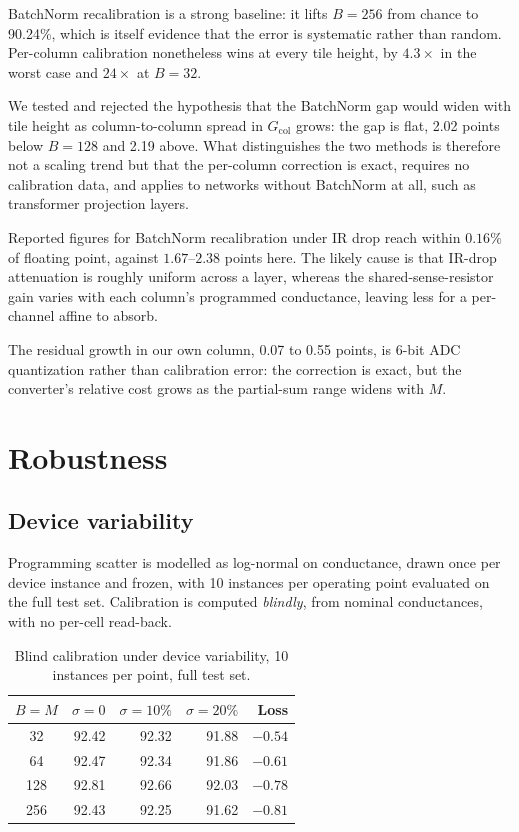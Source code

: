 \documentclass[conference,10pt]{IEEEtran}
\newcommand{\Gcol}{G_{\mathrm{col}}}
\begin{document}
BatchNorm recalibration is a strong baseline: it lifts $B{=}256$ from chance to
90.24\%, which is itself evidence that the error is systematic rather than
random. Per-column calibration nonetheless wins at every tile height, by
$4.3\times$ in the worst case and $24\times$ at $B{=}32$.

We tested and rejected the hypothesis that the BatchNorm gap would widen with
tile height as column-to-column spread in $\Gcol$ grows: the gap is flat, 2.02
points below $B{=}128$ and 2.19 above. What distinguishes the two methods is
therefore not a scaling trend but that the per-column correction is exact,
requires no calibration data, and applies to networks without BatchNorm at
all, such as transformer projection layers.

Reported figures for BatchNorm recalibration under IR drop reach within
$0.16\%$ of floating point, against $1.67$--$2.38$ points here. The likely cause is that IR-drop attenuation is
roughly uniform across a layer, whereas the shared-sense-resistor gain varies
with each column's programmed conductance, leaving less for a per-channel
affine to absorb.

The residual growth in our own column, 0.07 to 0.55 points, is 6-bit ADC
quantization rather than calibration error: the correction is exact, but the
converter's relative cost grows as the partial-sum range widens with $M$.

\section{Robustness}
\label{sec:robust}

\subsection{Device variability}

Programming scatter is modelled as log-normal on conductance, drawn once per
device instance and frozen, with 10 instances per operating point evaluated on
the full test set. Calibration is computed \emph{blindly}, from nominal
conductances, with no per-cell read-back.

\begin{table}[t]
\centering
\caption{Blind calibration under device variability, 10 instances per point,
full test set.}
\label{tab:var}
\begin{tabular}{crrrr}
\toprule
$B{=}M$ & $\sigma{=}0$ & $\sigma{=}10\%$ & $\sigma{=}20\%$ & Loss \\
\midrule
32  & 92.42 & 92.32 & 91.88 & $-0.54$ \\
64  & 92.47 & 92.34 & 91.86 & $-0.61$ \\
128 & 92.81 & 92.66 & 92.03 & $-0.78$ \\
256 & 92.43 & 92.25 & 91.62 & $-0.81$ \\
\bottomrule
\end{tabular}
\end{table}
\end{document}
